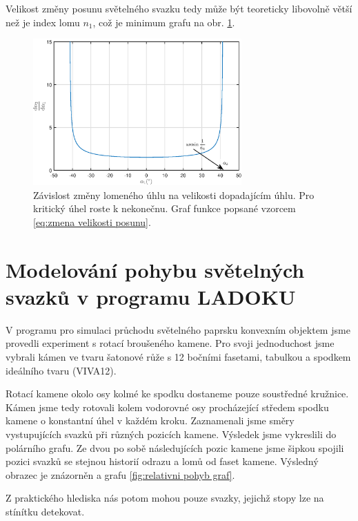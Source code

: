 Velikost změny posunu světelného svazku tedy může být teoreticky libovolně větší než je index lomu $n_1$, což je minimum grafu na obr. \ref{fig:derivace uhlu}. 

\begin{figure}[h!]
\begin{center}
\includegraphics[width = 8cm]{figures/derivace.eps}
\end{center}
\caption{Závislost změny lomeného úhlu na velikosti dopadajícím úhlu. Pro kritický úhel roste k nekonečnu. Graf funkce popsané vzorcem \ref{eq:zmena velikosti posunu}.}
\label{fig:derivace uhlu}
\end{figure}
\newpage


\section{Modelování pohybu světelných svazků v programu LADOKU}

V programu pro simulaci průchodu světelného paprsku konvexním objektem jsme provedli experiment s rotací broušeného kamene. Pro svoji jednoduchost jsme vybrali kámen ve tvaru šatonové růže s 12 bočními fasetami, tabulkou a spodkem ideálního tvaru (VIVA12).

Rotací kamene okolo osy kolmé ke spodku dostaneme pouze soustředné kružnice. Kámen jsme tedy rotovali kolem vodorovné osy procházející středem spodku kamene o konstantní úhel v každém kroku. Zaznamenali jsme směry vystupujících svazků při různých pozicích kamene. Výsledek jsme vykreslili do polárního grafu. Ze dvou po sobě následujících pozic kamene jsme šipkou spojili pozici svazků se stejnou historií odrazu a lomů od faset kamene. Výsledný obrazec je znázorněn a grafu \ref{fig:relativni pohyb graf}.

Z praktického hlediska nás potom mohou pouze svazky, jejichž stopy lze na stínítku detekovat.

